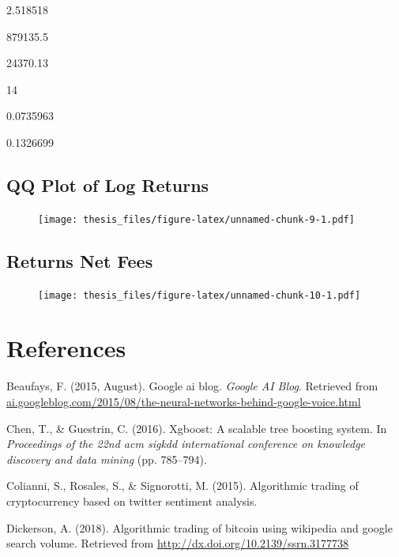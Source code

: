\documentclass[12pt,twoside]{dukestatscithesis}
\begin{document}
2.518518

879135.5

24370.13

14

0.0735963

0.1326699

\section{QQ Plot of Log Returns}\label{qq-plot-of-log-returns}
\begin{figure}
\centering
\texttt{[image: thesis\_files/figure-latex/unnamed-chunk-9-1.pdf]}
\caption{}
\end{figure}
\section{Returns Net Fees}\label{returns-net-fees}
\begin{figure}
\centering
\texttt{[image: thesis\_files/figure-latex/unnamed-chunk-10-1.pdf]}
\caption{}
\end{figure}
\backmatter

\chapter*{References}\label{references}


\noindent

\setlength{\parindent}{-0.20in} \setlength{\leftskip}{0.20in}
\setlength{\parskip}{8pt}

\hypertarget{refs}{}
\hypertarget{ref-beaufays2015}{}
Beaufays, F. (2015, August). Google ai blog. \emph{Google AI Blog}.
Retrieved from
\url{ai.googleblog.com/2015/08/the-neural-networks-behind-google-voice.html}

\hypertarget{ref-chen2016}{}
Chen, T., \& Guestrin, C. (2016). Xgboost: A scalable tree boosting
system. In \emph{Proceedings of the 22nd acm sigkdd international
conference on knowledge discovery and data mining} (pp. 785--794).

\hypertarget{ref-colianni2015}{}
Colianni, S., Rosales, S., \& Signorotti, M. (2015). Algorithmic trading
of cryptocurrency based on twitter sentiment analysis.

\hypertarget{ref-dickerson2018}{}
Dickerson, A. (2018). Algorithmic trading of bitcoin using wikipedia and
google search volume. Retrieved from
\url{http://dx.doi.org/10.2139/ssrn.3177738}
\end{document}
